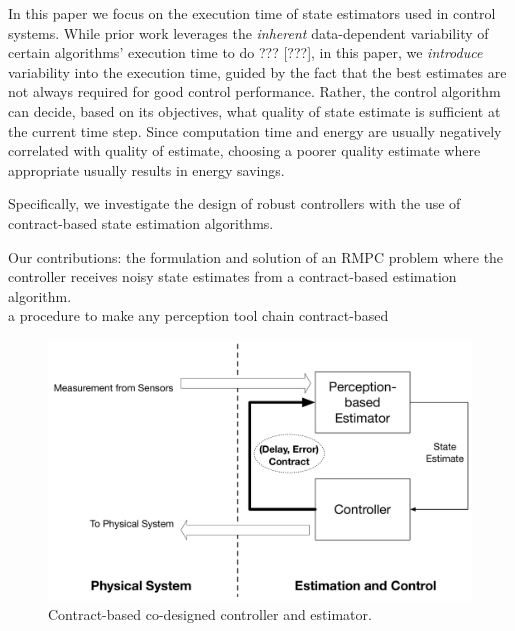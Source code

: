 In this paper we focus on the execution time of state estimators used in control systems.
While prior work leverages the \emph{inherent} data-dependent variability of certain algorithms' execution time to do ??? [???], in this paper, we \emph{introduce} variability into the execution time, guided by the fact that the best estimates are not always required for good control performance.
Rather, the control algorithm can decide, based on its objectives, what quality of state estimate is sufficient at the current time step.
Since computation time and energy are usually negatively correlated with quality of estimate, choosing a poorer quality estimate where appropriate usually results in energy savings.

Specifically, we investigate the design of robust controllers with the use of contract-based state estimation algorithms.

Our contributions:
the formulation and solution of an RMPC problem where the controller receives noisy state estimates from a contract-based estimation algorithm.
\\
a procedure to make any perception tool chain contract-based


\begin{figure}[t]
	\centering
		\includegraphics[width=0.9\columnwidth]{figures/omnigraffle_figures/high_level_figure.pdf}
		\caption{Contract-based co-designed controller and estimator.}
		\label{fig:codesignedCE}
\end{figure}


